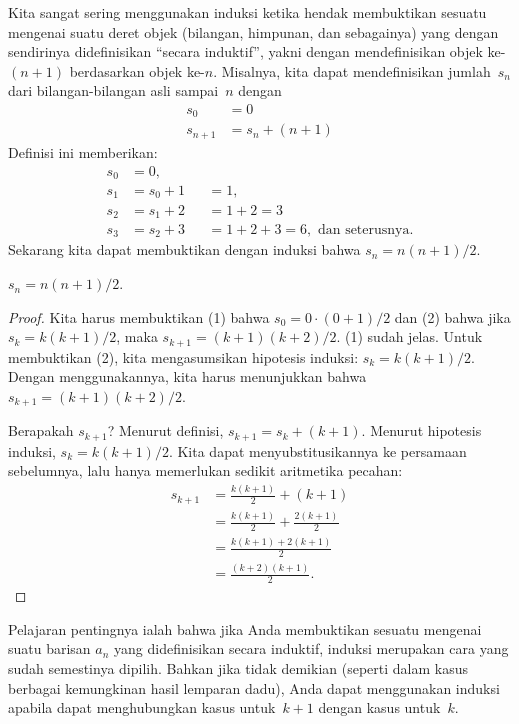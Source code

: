 \documentclass[../../../include/open-logic-section]{subfiles}
\begin{document}
Kita sangat sering menggunakan induksi ketika hendak membuktikan sesuatu
mengenai suatu deret objek (bilangan, himpunan, dan sebagainya) yang dengan
sendirinya didefinisikan ``secara induktif'', yakni dengan mendefinisikan
objek ke-$(n+1)$ berdasarkan objek ke-$n$. Misalnya, kita dapat
mendefinisikan jumlah~$s_n$ dari bilangan-bilangan asli sampai~$n$ dengan
\begin{align*}
  s_0 & = 0\\
  s_{n+1} & = s_n + (n+1)
\end{align*}
Definisi ini memberikan:
\begin{align*}
  s_0 & = 0,\\
  s_1 & = s_0 + 1 && = 1,\\
  s_2 & = s_1 + 2 && = 1 + 2 = 3\\
  s_3 & = s_2 + 3 && = 1 + 2 + 3 = 6, \text{ dan seterusnya.}
\end{align*}
Sekarang kita dapat membuktikan dengan induksi bahwa $s_n = n(n+1)/2$.

\begin{prop}
  $s_n = n(n+1)/2$.
\end{prop}

\begin{proof}
  Kita harus membuktikan (1) bahwa $s_0 = 0\cdot(0 + 1)/2$ dan (2) bahwa
  jika $s_k = k(k+1)/2$, maka $s_{k+1} = (k+1)(k+2)/2$. (1) sudah jelas.
  Untuk membuktikan (2), kita mengasumsikan hipotesis induksi: $s_k =
  k(k+1)/2$. Dengan menggunakannya, kita harus menunjukkan bahwa $s_{k+1}
  = (k+1)(k+2)/2$.

  Berapakah $s_{k+1}$? Menurut definisi, $s_{k+1} = s_k + (k+1)$. Menurut
  hipotesis induksi, $s_k = k(k+1)/2$. Kita dapat menyubstitusikannya ke
  persamaan sebelumnya, lalu hanya memerlukan sedikit aritmetika pecahan:
  \begin{align*}
    s_{k+1} & = \frac{k(k+1)}{2} + (k+1) \\
    & = \frac{k(k+1)}{2} + \frac{2(k+1)}{2} \\
    & = \frac{k(k+1) + 2(k+1)}{2} \\
    & = \frac{(k+2)(k+1)}{2}.
  \end{align*}
\end{proof}

Pelajaran pentingnya ialah bahwa jika Anda membuktikan sesuatu mengenai
suatu barisan $a_n$ yang didefinisikan secara induktif, induksi merupakan
cara yang sudah semestinya dipilih. Bahkan jika tidak demikian (seperti
dalam kasus berbagai kemungkinan hasil lemparan dadu), Anda dapat
menggunakan induksi apabila dapat menghubungkan kasus untuk~$k+1$ dengan
kasus untuk~$k$.
\end{document}
